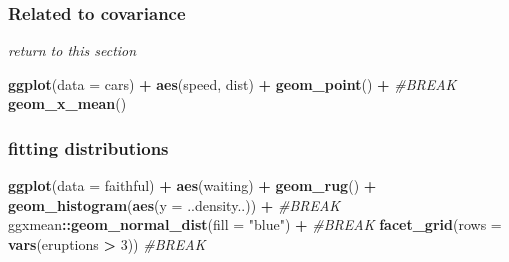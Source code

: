 \documentclass[12pt]{article}
\newenvironment{Shaded}{\begin{snugshade}}{\end{snugshade}}
\newcommand{\CommentTok}[1]{\textcolor[rgb]{0.56,0.35,0.01}{\textit{#1}}}
\newcommand{\DataTypeTok}[1]{\textcolor[rgb]{0.13,0.29,0.53}{#1}}
\newcommand{\DecValTok}[1]{\textcolor[rgb]{0.00,0.00,0.81}{#1}}
\newcommand{\KeywordTok}[1]{\textcolor[rgb]{0.13,0.29,0.53}{\textbf{#1}}}
\newcommand{\NormalTok}[1]{#1}
\newcommand{\OperatorTok}[1]{\textcolor[rgb]{0.81,0.36,0.00}{\textbf{#1}}}
\newcommand{\StringTok}[1]{\textcolor[rgb]{0.31,0.60,0.02}{#1}}
\begin{document}
\hypertarget{related-to-covariance}{%
\subsubsection{Related to covariance}\label{related-to-covariance}}

\emph{return to this section}

\begin{Shaded}
\begin{Highlighting}[]
\KeywordTok{ggplot}\NormalTok{(}\DataTypeTok{data =}\NormalTok{ cars) }\OperatorTok{+}\StringTok{ }
\StringTok{  }\KeywordTok{aes}\NormalTok{(speed, dist) }\OperatorTok{+}\StringTok{ }
\StringTok{  }\KeywordTok{geom_point}\NormalTok{() }\OperatorTok{+}\StringTok{ }\CommentTok{#BREAK}
\StringTok{  }\KeywordTok{geom_x_mean}\NormalTok{()}
\end{Highlighting}
\end{Shaded}

\hypertarget{fitting-distributions}{%
\subsubsection{fitting distributions}\label{fitting-distributions}}

\begin{Shaded}
\begin{Highlighting}[]
\KeywordTok{ggplot}\NormalTok{(}\DataTypeTok{data =}\NormalTok{ faithful) }\OperatorTok{+}\StringTok{ }
\StringTok{  }\KeywordTok{aes}\NormalTok{(waiting) }\OperatorTok{+}\StringTok{ }
\StringTok{  }\KeywordTok{geom_rug}\NormalTok{() }\OperatorTok{+}\StringTok{ }
\StringTok{  }\KeywordTok{geom_histogram}\NormalTok{(}\KeywordTok{aes}\NormalTok{(}\DataTypeTok{y =}\NormalTok{ ..density..)) }\OperatorTok{+}\StringTok{ }\CommentTok{#BREAK}
\StringTok{  }\NormalTok{ggxmean}\OperatorTok{::}\KeywordTok{geom_normal_dist}\NormalTok{(}\DataTypeTok{fill =} \StringTok{"blue"}\NormalTok{) }\OperatorTok{+}\StringTok{ }\CommentTok{#BREAK}
\StringTok{  }\KeywordTok{facet_grid}\NormalTok{(}\DataTypeTok{rows =} \KeywordTok{vars}\NormalTok{(eruptions }\OperatorTok{>}\StringTok{ }\DecValTok{3}\NormalTok{)) }\CommentTok{#BREAK}
\end{Highlighting}
\end{Shaded}
\end{document}
